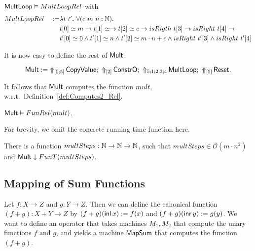 \begin{lemma}
  \label{lem:Mult_Loop_Realise}
  \label{lem:Mult_Loop_Realise}
  $\MS{MultLoop} \Realise MultLoopRel$ with
  \begin{alignat*}{2}
    & MultLoopRel ~&:=& \lambda t~t'.~\forall (c~m~n:\Nat). \\
    &&& t[0] \simeq m \rightarrow t[1] \simeq \rightarrow t[2] \simeq c \rightarrow isRigth~t[3] \rightarrow isRight~t[4] \rightarrow \\
    &&& t'[0] \simeq 0 \land t'[1] \simeq n \land t'[2] \simeq m \cdot n + c \land isRight~t'[3] \land isRight~t'[4]
  \end{alignat*}
\end{lemma}

It is now easy to define the rest of $\MS{Mult}$.
\begin{definition}[$\MS{Mult}$][Mult]
  \label{def:Mult}
  \[
    \MS{Mult} :=
    \LiftTapes{\MS{CopyValue}}{\Vector{0;5}} \Seq
    \LiftTapes{\MS{ConstrO}}{\Vector{2}} \Seq
    \LiftTapes{\MS{MultLoop}}{5;1;2;3;4} \Seq
    \LiftTapes{\MS{Reset}}{\Vector{5}}.
  \]
\end{definition}

It follows that $\MS{Mult}$ computes the function $mult$, w.r.t.\ Definition~\ref{def:Computes2_Rel}.
\begin{lemma}
  \label{lem:Mult_Computes}
  $\MS{Mult} \Realise FunRel(mult)$.
\end{lemma}

For brevity,  we omit the concrete running time function here.  
\begin{lemma}
  There is a function $multSteps : \Nat\to\Nat\to\Nat$, such that $multSteps \in \mathcal{O}(m \cdot n^2)$ and
  $\MS{Mult} \TerminatesIn FunT(multSteps)$.
\end{lemma}

\subsection{Mapping of Sum Functions}
\label{sec:SumTM}
%

Let $f : X \to Z$ and $g : Y \to Z$.  Then we can define the canonical function $(f+g) : X+Y \to Z$ by $(f+g)(\inl x):=f(x)$ and
$(f+g)(\inr y):=g(y)$.  We want to define an operator that takes machines $M_1, M_2$ that compute the unary functions $f$ and $g$, and yields a
machine $\MS{MapSum}$ that computes the function $(f+g)$.


